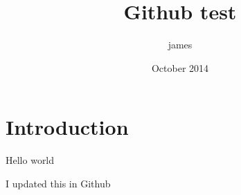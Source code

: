 \documentclass{article}
\title{Github test}
\author{james }
\date{October 2014}
\begin{document}
\maketitle

\section{Introduction}

Hello world

I updated this in Github
\end{document}
